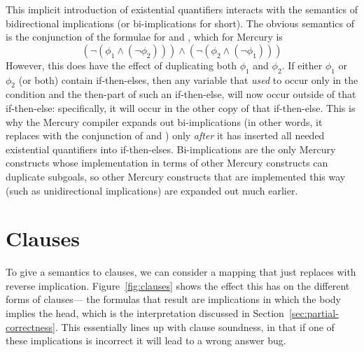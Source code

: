 This implicit introduction of existential quantifiers
interacts with the semantics of bidirectional implications
(or bi-implications for short).
The obvious semantics of 
is the conjunction of the formulae
for  and ,
which for Mercury is
\[
    (\lnot (\phi_1 \land (\lnot \phi_2))) \land
    (\lnot (\phi_2 \land (\lnot \phi_1)))
\]
However, this does have the effect of duplicating both $\phi_1$ and $\phi_2$.
If either $\phi_1$ or $\phi_2$ (or both) contain if-then-elses,
then any variable that \emph{used} to occur
only in the condition and the then-part of such an if-then-else,
will now occur outside of that if-then-else:
specifically, it will occur in the other copy of that if-then-else.
This is why the Mercury compiler expands out bi-implications
(in other words, it replaces 
with the conjunction of  and )
only \emph{after} it has inserted all needed existential quantifiers
into if-then-elses.
Bi-implications are the only Mercury constructs
whose implementation in terms of other Mercury constructs
can duplicate subgoals,
so other Mercury constructs that are implemented this way
(such as unidirectional implications)
are expanded out much earlier.



\section{Clauses}
\label{sec:clauses}

To give a semantics to clauses,
we can consider a mapping that just
replaces \co{:-} with reverse implication.
Figure~\ref{fig:clauses} shows the effect this has
on the different forms of clauses---%
the formulas that result are implications
in which the body implies the head,
which is the interpretation discussed in Section~\ref{sec:partial-correctness}.
This essentially lines up with clause soundness,
in that if one of these implications is incorrect
it will lead to a wrong answer bug.

